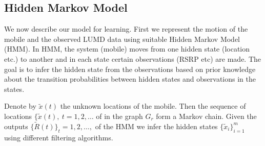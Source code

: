 \documentclass[conference, 10pt]{IEEEtran}
\begin{document}
\subsection{Hidden Markov Model}
We now describe our model for learning. First we
represent the motion of the mobile and the observed LUMD data using suitable Hidden
Markov Model (HMM). In HMM, the system (mobile) moves from one hidden state
(location etc.) to another and in each state certain observations (RSRP etc)
are made. The goal is to infer the hidden state from the observations based on
prior knowledge about the transition probabilities between hidden states and
observations in the states.

Denote by $\tilde{x}(t)$ the unknown locations of the
mobile. Then the sequence of locations $\{\tilde{x}(t),\ t=1,2,\hdots$ of
in the graph $G_r$ form a Markov chain.  Given the outputs
$\{\tilde{R}(t)\}_t=1,2,\hdots,$ of the HMM we infer the hidden states
$\{\tilde{x}_i\}_{i=1}^m$ using different filtering algorithms. 
\end{document}
